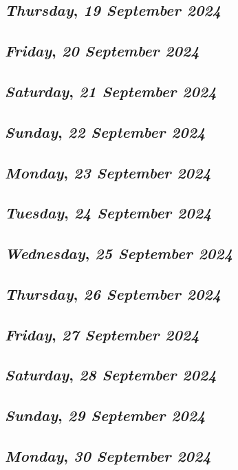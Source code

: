 \def\day{\textit{19 September 2024}}
\def\weekday{\textit{Thursday}}
\subsection*{\weekday, \day}

\def\day{\textit{20 September 2024}}
\def\weekday{\textit{Friday}}
\subsection*{\weekday, \day}

\def\day{\textit{21 September 2024}}
\def\weekday{\textit{Saturday}}
\subsection*{\weekday, \day}

\def\day{\textit{22 September 2024}}
\def\weekday{\textit{Sunday}}
\subsection*{\weekday, \day}

\def\day{\textit{23 September 2024}}
\def\weekday{\textit{Monday}}
\subsection*{\weekday, \day}

\def\day{\textit{24 September 2024}}
\def\weekday{\textit{Tuesday}}
\subsection*{\weekday, \day}

\def\day{\textit{25 September 2024}}
\def\weekday{\textit{Wednesday}}
\subsection*{\weekday, \day}

\def\day{\textit{26 September 2024}}
\def\weekday{\textit{Thursday}}
\subsection*{\weekday, \day}

\def\day{\textit{27 September 2024}}
\def\weekday{\textit{Friday}}
\subsection*{\weekday, \day}

\def\day{\textit{28 September 2024}}
\def\weekday{\textit{Saturday}}
\subsection*{\weekday, \day}

\def\day{\textit{29 September 2024}}
\def\weekday{\textit{Sunday}}
\subsection*{\weekday, \day}

\def\day{\textit{30 September 2024}}
\def\weekday{\textit{Monday}}
\subsection*{\weekday, \day}